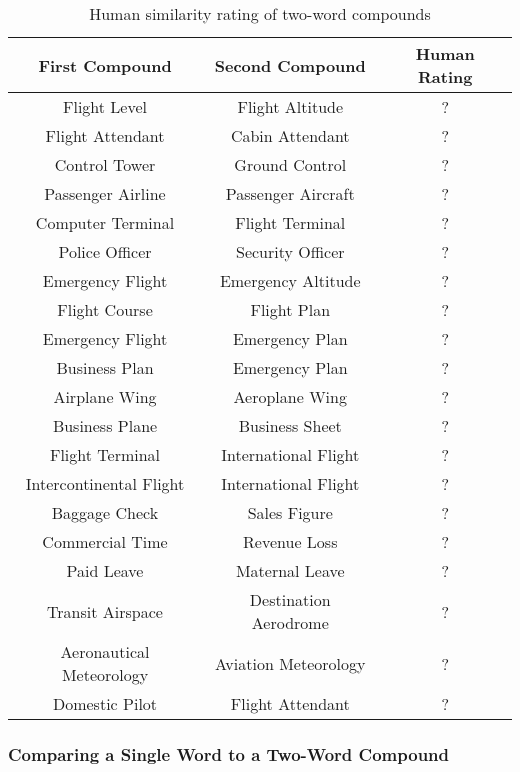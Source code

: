 \documentclass{article}
\begin{document}
\begin{table}[h!]
\centering
\begin{tabular}{|c|c||c|}
	\hline
	First Compound & Second Compound & Human Rating \\
	\hline
	Flight Level & Flight Altitude & ? \\
	Flight Attendant & Cabin Attendant & ? \\
	Control Tower & Ground Control & ? \\
	Passenger Airline & Passenger Aircraft & ? \\
	Computer Terminal & Flight Terminal & ? \\
	Police Officer & Security Officer & ? \\
	Emergency Flight & Emergency Altitude & ? \\
	Flight Course & Flight Plan & ? \\
	Emergency Flight & Emergency Plan & ? \\
	Business Plan & Emergency Plan & ? \\
	Airplane Wing & Aeroplane Wing & ? \\
	Business Plane & Business Sheet & ? \\
	Flight Terminal & International Flight & ? \\
	Intercontinental Flight & International Flight & ? \\
	Baggage Check & Sales Figure & ? \\
	Commercial Time & Revenue Loss & ? \\
	Paid Leave & Maternal Leave & ? \\
	Transit Airspace & Destination Aerodrome & ? \\
	Aeronautical Meteorology & Aviation Meteorology & ? \\
	Domestic Pilot & Flight Attendant & ? \\
	\hline
\end{tabular}
\caption{Human similarity rating of two-word compounds}
\label{table:humancompoundsimilarity}
\end{table}

\subsubsection{Comparing a Single Word to a Two-Word Compound}
\end{document}
